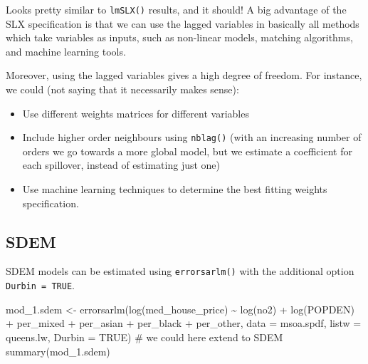 \documentclass[
  letterpaper,
]{scrbook}
\newenvironment{Shaded}{\begin{snugshade}}{\end{snugshade}}
\newcommand{\AttributeTok}[1]{\textcolor[rgb]{0.40,0.45,0.13}{#1}}
\newcommand{\CommentTok}[1]{\textcolor[rgb]{0.37,0.37,0.37}{#1}}
\newcommand{\ConstantTok}[1]{\textcolor[rgb]{0.56,0.35,0.01}{#1}}
\newcommand{\FunctionTok}[1]{\textcolor[rgb]{0.28,0.35,0.67}{#1}}
\newcommand{\NormalTok}[1]{\textcolor[rgb]{0.00,0.23,0.31}{#1}}
\newcommand{\OtherTok}[1]{\textcolor[rgb]{0.00,0.23,0.31}{#1}}
\newcommand{\SpecialCharTok}[1]{\textcolor[rgb]{0.37,0.37,0.37}{#1}}
\begin{document}
Looks pretty similar to \texttt{lmSLX()} results, and it should! A big
advantage of the SLX specification is that we can use the lagged
variables in basically all methods which take variables as inputs, such
as non-linear models, matching algorithms, and machine learning tools.

Moreover, using the lagged variables gives a high degree of freedom. For
instance, we could (not saying that it necessarily makes sense):

\begin{itemize}
\item
  Use different weights matrices for different variables
\item
  Include higher order neighbours using \texttt{nblag()} (with an
  increasing number of orders we go towards a more global model, but we
  estimate a coefficient for each spillover, instead of estimating just
  one)
\item
  Use machine learning techniques to determine the best fitting weights
  specification.
\end{itemize}

\hypertarget{sdem}{%
\subsection{SDEM}\label{sdem}}

SDEM models can be estimated using \texttt{errorsarlm()} with the
additional option \texttt{Durbin\ =\ TRUE}.

\begin{Shaded}
\begin{Highlighting}[]
\NormalTok{mod\_1.sdem }\OtherTok{\textless{}{-}} \FunctionTok{errorsarlm}\NormalTok{(}\FunctionTok{log}\NormalTok{(med\_house\_price) }\SpecialCharTok{\textasciitilde{}} \FunctionTok{log}\NormalTok{(no2) }\SpecialCharTok{+} \FunctionTok{log}\NormalTok{(POPDEN) }\SpecialCharTok{+}
\NormalTok{                          per\_mixed }\SpecialCharTok{+}\NormalTok{ per\_asian }\SpecialCharTok{+}\NormalTok{ per\_black }\SpecialCharTok{+}\NormalTok{ per\_other,  }
                        \AttributeTok{data =}\NormalTok{ msoa.spdf, }
                        \AttributeTok{listw =}\NormalTok{ queens.lw,}
                        \AttributeTok{Durbin =} \ConstantTok{TRUE}\NormalTok{) }\CommentTok{\# we could here extend to SDEM}
\FunctionTok{summary}\NormalTok{(mod\_1.sdem)}
\end{Highlighting}
\end{Shaded}
\end{document}
